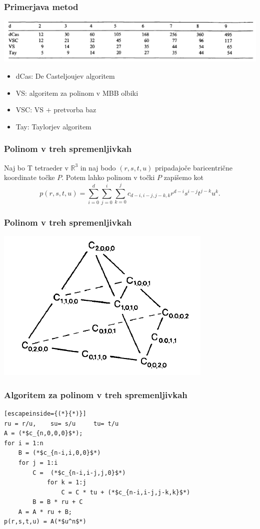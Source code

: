 \documentclass{beamer}
\begin{document}
\begin{frame}
\frametitle{Primerjava metod}

\begin{center}
\includegraphics[width=1.0\linewidth]{tabelca.PNG}
\end{center}

\begin{itemize}
\item dCas: De Casteljoujev algoritem
\item VS: algoritem za polinom v MBB olbiki
\item VSC: VS $+$ pretvorba baz
\item Tay: Taylorjev algoritem
\end{itemize}


\end{frame}

\begin{frame}
\frametitle{Polinom v treh spremenljivkah}
Naj bo T tetraeder v $\mathbb{R}^3$ in naj bodo $(r,s,t,u)$ pripadajoče baricentrične koordinate točke $P$. Potem lahko polinom v točki $P$ zapišemo kot
$$p(r,s,t,u) = \sum_{i=0}^{d}\sum_{j=0}^{i}\sum_{k=0}^{j}c_{d-i,i-j,j-k,k}r^{d-i}s^{i-j}t^{j-k}u^{k}.$$
\end{frame}


\begin{frame}
\frametitle{Polinom v treh spremenljivkah}
\begin{center}
\includegraphics[width=0.7\linewidth]{tetraeder.PNG}
\end{center}
\end{frame}

\begin{frame}[fragile]
\frametitle{Algoritem za polinom v treh spremenljivkah}
\begin{lstlisting}[escapeinside={(*}{*)}]
ru = r/u,	 su= s/u	 tu= t/u
A = (*$c_{n,0,0,0}$*);
for i = 1:n
    B = (*$c_{n-i,i,0,0}$*)
    for j = 1:i
        C =  (*$c_{n-i,i-j,j,0}$*)
            for k = 1:j
                C = C * tu + (*$c_{n-i,i-j,j-k,k}$*)
        B = B * ru + C
    A = A * ru + B;
p(r,s,t,u) = A(*$u^n$*)
\end{lstlisting}
\end{frame}
\end{document}
